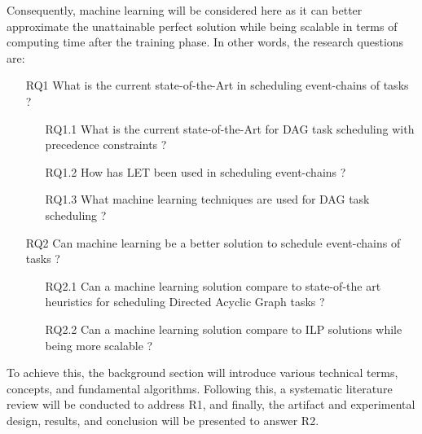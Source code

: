 Consequently, machine learning will be considered here as it can 
better approximate the unattainable perfect solution while being 
scalable in terms of computing time after the training phase. In 
other words, the research questions are:

\begin{itemize}
    \item [RQ1] What is the current state-of-the-Art in scheduling event-chains of tasks ?
            \begin{itemize}
                \item [RQ1.1] What is the current state-of-the-Art for DAG task scheduling with precedence constraints ?
                \item [RQ1.2] How has LET been used in scheduling event-chains ?
                \item [RQ1.3] What machine learning  techniques are used for DAG task scheduling ?
            \end{itemize}
    \item [RQ2]  Can machine learning be a better solution to schedule event-chains of tasks ?
            \begin{itemize}
                \item [RQ2.1] Can a machine learning solution compare to state-of-the art heuristics for scheduling Directed Acyclic Graph tasks ?
                \item [RQ2.2] Can a machine learning solution compare to ILP solutions while being more scalable ?
            \end{itemize}    
\end{itemize}

To achieve this, the background section will introduce various 
technical terms, concepts, and fundamental algorithms. 
Following this, a systematic literature review will be conducted to address R1, 
and finally, the artifact and experimental design, results, and conclusion will 
be presented to answer R2.




